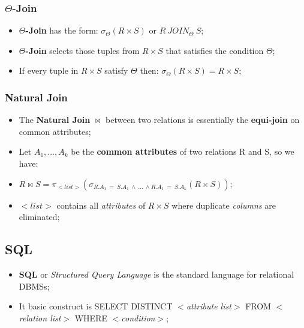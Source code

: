 \documentclass{article}
\begin{document}
\subsubsection{$\Theta$-Join}
\begin{itemize}
\item \textbf{$\Theta$-Join} has the form: $\sigma_{\Theta}(R \times S)$ or $R\ JOIN_{\Theta}\ S$;
\item \textbf{$\Theta$-Join} selects those tuples from $R \times S$ that satisfies the condition $\Theta$;
\item If every tuple in $R \times S$ satisfy $\Theta$ then: $\sigma_{\Theta}(R \times S) = R \times S$;
\end{itemize}
\subsubsection{Natural Join}
\begin{itemize}
\item The \textbf{Natural Join} $\bowtie$ between two relations is essentially the \textbf{equi-join} on common attributes;
\item Let $A_{1}, ... , A_{k}$ be the \textbf{common attributes} of two relations R and S, so we have:
\item $R \bowtie S = \pi _{<list>}(\sigma _{R.A_{1}\ =\ S.A_{1}\ \wedge\ ...\ \wedge R.A_{1}\ =\ S.A_{k}}(R \times S))$;
\item $<list>$ contains all \emph{attributes} of $R \times S$ where duplicate \emph{columns} are eliminated;
\end{itemize}
\subsection{SQL}
\begin{itemize}
\item \textbf{SQL} or \emph{Structured Query Language} is the standard language for relational DBMSs;
\item It basic construct is SELECT DISTINCT $<$\emph{attribute list}$>$ FROM $<$\emph{relation list}$>$ WHERE $<$\emph{condition}$>$;
\end{itemize}
\begin{table}[H]
\centering
{}
\end{table}
\newpage
\end{document}

